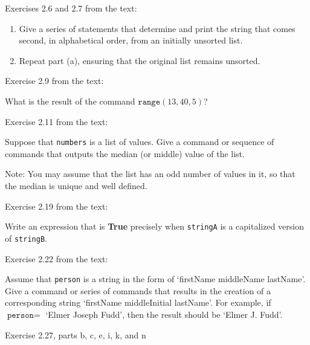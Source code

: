 \documentclass[11pt]{article}
\begin{document}
\begin{problems}

\item Exercises 2.6 and 2.7 from the text:
\begin{enumerate}

\item Give a series of statements that determine and print the string that
comes second, in alphabetical order, from an initially unsorted
list.

\item Repeat part (a), ensuring that the original list remains unsorted.

\end{enumerate}


\item Exercise 2.9 from the text:

What is the result of the command $\texttt{range}(13,40,5)$?

\item Exercise 2.11 from the text:

Suppose that \texttt{numbers} is a list of values.  Give a command
or sequence of commands that outputs the median (or middle) value of
the list.

Note: You may assume that the list has an odd number of values in
it, so that the median is unique and well defined.

\item Exercise 2.19 from the text:

Write an expression that is {\bf True} precisely when
\texttt{stringA} is a capitalized version of \texttt{stringB}.

\item Exercise 2.22 from the text:

Assume that \texttt{person} is a string in the form of `firstName
middleName lastName'.  Give a command or series of commands that
results in the creation of a corresponding string `firstName
middleInitial lastName'.  For example, if $\texttt{person} =$ `Elmer
Joseph Fudd', then the result should be `Elmer J. Fudd'.

\item Exercise 2.27, parts b, c, e, i, k, and n
\end{problems}
\end{document}
